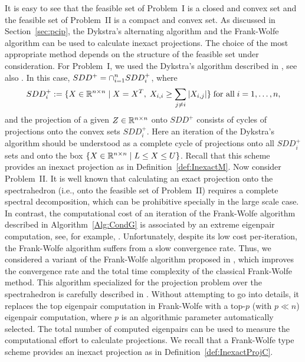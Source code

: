 It is easy to see that the feasible set of Problem~I is a closed and convex set and the feasible set of Problem~II is  a compact and convex set. 
As discussed in Section~\ref{sec:pcip}, the Dykstra's alternating algorithm and the Frank-Wolfe algorithm can be used to calculate inexact projections. The choice of the most appropriate method depends on the structure of the feasible set under consideration. 
For Problem~I, we used the Dykstra's algorithm described in \cite{BirginMartinezRaydan2003}, see also \cite{dykstraSDD}. In this case, $SDD^+=\displaystyle\cap_{i=1}^n SDD^+_i$, where 
$$SDD^+_i :=\{X\in\mathbb{R}^{n\times n}\mid X=X^T, \; X_{i,i}\geq \displaystyle\sum_{j\neq i}|X_{i,j}| \} \; \mbox{for all} \; i=1,\ldots,n,$$
and the projection of a given $Z\in\mathbb{R}^{n\times n}$ onto $SDD^+$ consists of cycles of projections onto the convex sets $SDD^+_i$.
Here an iteration of the Dykstra's algorithm should be understood as a complete cycle of projections onto all $SDD^+_i $ sets and onto the box $\{X\in\mathbb{R}^{n\times n}\mid L\leq X\leq U\}$.
Recall that this scheme provides an inexact projection as in Definition~\ref{def:InexactM}.
%
Now consider Problem~II. It is well known that calculating an exact projection onto the spectrahedron (i.e., onto the feasible set of Problem~II) requires a complete spectral decomposition, which can be prohibitive specially in the large scale case. In contrast, the computational cost of an iteration of the Frank-Wolfe algorithm described in Algorithm~\ref{Alg:CondG} is associated by an extreme eigenpair computation, see, for example, \cite{Jaggi2013}. Unfortunately, despite its low cost per-iteration, the Frank-Wolfe algorithm suffers from a slow convergence rate.
Thus, we considered a variant of the Frank-Wolfe algorithm proposed in \cite{allen2017linear}, which improves the convergence rate and the total time complexity of the classical Frank-Wolfe method. This algorithm specialized for the projection problem over the spectrahedron is carefully described in \cite{aguiar2021inexact}.
Without attempting to go into details, it replaces the top eigenpair computation in Frank-Wolfe with a top-$p$ (with $p\ll n$) eigenpair computation, where $p$ is an algorithmic parameter automatically selected.
The total number of computed eigenpairs can be used to measure the computational effort to calculate projections.
We recall that a Frank-Wolfe type scheme provides an inexact projection as in Definition~\ref{def:InexactProjC}.


